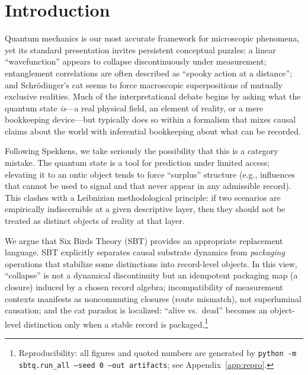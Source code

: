 \section{Introduction}

Quantum mechanics is our most accurate framework for microscopic phenomena, yet its standard presentation invites persistent conceptual puzzles: a linear ``wavefunction'' appears to collapse discontinuously under measurement; entanglement correlations are often described as ``spooky action at a distance''; and Schr\"odinger's cat seems to force macroscopic superpositions of mutually exclusive realities. Much of the interpretational debate begins by asking what the quantum state \emph{is}---a real physical field, an element of reality, or a mere bookkeeping device---but typically does so within a formalism that mixes causal claims about the world with inferential bookkeeping about what can be recorded.

Following Spekkens, we take seriously the possibility that this is a category mistake.\cite{Spekkens2007Toy} The quantum state is a tool for prediction under limited access; elevating it to an ontic object tends to force ``surplus'' structure (e.g., influences that cannot be used to signal and that never appear in any admissible record). This clashes with a Leibnizian methodological principle: if two scenarios are empirically indiscernible at a given descriptive layer, then they should not be treated as distinct objects of reality at that layer.

We argue that Six Birds Theory (SBT) provides an appropriate replacement language.\cite{Tsiokos2026SixBirds} SBT explicitly separates causal substrate dynamics from \emph{packaging} operations that stabilize some distinctions into record-level objects. In this view, ``collapse'' is not a dynamical discontinuity but an idempotent packaging map (a closure) induced by a chosen record algebra; incompatibility of measurement contexts manifests as noncommuting closures (route mismatch), not superluminal causation; and the cat paradox is localized: ``alive vs.\ dead'' becomes an object-level distinction only when a stable record is packaged.\footnote{Reproducibility: all figures and quoted numbers are generated by \texttt{python -m sbtq.run\_all --seed 0 --out artifacts}; see Appendix~\ref{app:repro}.}

